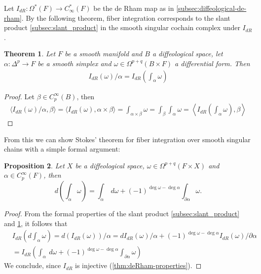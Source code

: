 \documentclass{scrartcl}
\theoremstyle{plain}
\newtheorem{theorem}{Theorem}[section]
\newtheorem{proposition}[theorem]{Proposition}
\theoremstyle{definition}
\begin{document}
Let $I_{dR}\colon \Omega^*(F)\to C_\infty^*(F)$ be the de Rham map as in \cref{subsec:diffeological-de-rham}. By the following theorem, fiber integration corresponds to the slant product \cref{subsec:slant_product} in the smooth singular cochain complex under $I_{dR}$.
\begin{theorem}\label{thm:fiber-integral-slant-product}
    Let $F$ be a smooth manifold and $B$ a diffeological space, let $\alpha\colon\Delta^p\to F$ be a smooth simplex and $\omega\in\Omega^{p+q}(B\times F)$ a differential form. Then
    \begin{align*}
        I_{dR}(\omega) / \alpha = I_{dR}\left(\int_{\alpha} \omega\right)
    \end{align*}
\end{theorem}
\begin{proof}
    Let $\beta\in C^\infty_p(B)$, then
    \begin{align*}
        \langle I_{dR}(\omega) / \alpha, \beta\rangle = \langle I_{dR}(\omega), \alpha\times \beta\rangle = \int_{\alpha\times \beta} \omega = \int_\beta \int_\alpha\omega = \left\langle I_{dR}\left(\int_{\alpha}\omega\right), \beta\right\rangle
    \end{align*}
\end{proof}

From this we can show Stokes' theorem for fiber integration over smooth singular chains with a simple formal argument:
\begin{proposition}\label{thm:fiber-stokes}
    Let $X$ be a diffeological space, $\omega\in\Omega^{p+q}(F\times X)$ and $\alpha\in C_p^\infty(F)$, then
    $$d\left(\int_\alpha\omega\right) = \int_\alpha\ d\omega + (-1)^{\deg \omega - \deg\alpha}\int_{\partial \alpha} \omega.$$
\end{proposition}
\begin{proof}
    From the formal properties of the slant product \cref{subsec:slant_product} and \ref{thm:fiber-integral-slant-product}, it follows that
    \begin{align*}
        &I_{dR}\left(d\int_\alpha\omega\right) = d (I_{dR}(\omega)) / \alpha = dI_{dR}(\omega) / \alpha + (-1)^{\deg \omega - \deg \alpha}I_{dR}(\omega) / \partial \alpha \\&= I_{dR}\left(\int_\alpha\ d\omega + (-1)^{\deg \omega - \deg\alpha}\int_{\partial \alpha} \omega\right)
    \end{align*}
    We conclude, since $I_{dR}$ is injective (\ref{thm:deRham-properties}).
\end{proof}
\end{document}
